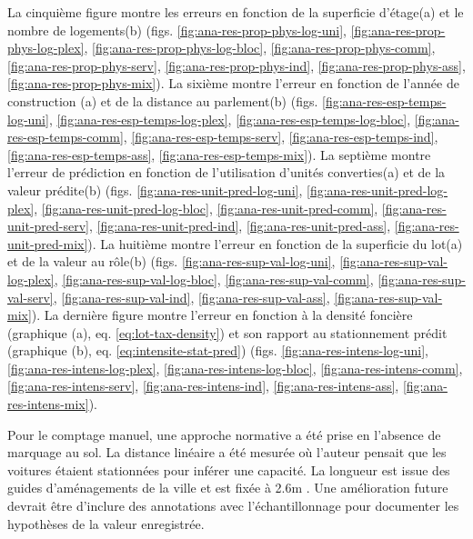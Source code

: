 La cinquième figure montre les erreurs en fonction de la superficie d'étage(a) et le nombre de logements(b) (figs. \ref{fig:ana-res-prop-phys-log-uni}, \ref{fig:ana-res-prop-phys-log-plex}, \ref{fig:ana-res-prop-phys-log-bloc}, \ref{fig:ana-res-prop-phys-comm}, \ref{fig:ana-res-prop-phys-serv}, \ref{fig:ana-res-prop-phys-ind}, \ref{fig:ana-res-prop-phys-ass}, \ref{fig:ana-res-prop-phys-mix}). La sixième montre l'erreur en fonction de l'année de construction (a) et de la distance au parlement(b) (figs. \ref{fig:ana-res-esp-temps-log-uni}, \ref{fig:ana-res-esp-temps-log-plex}, \ref{fig:ana-res-esp-temps-log-bloc}, \ref{fig:ana-res-esp-temps-comm}, \ref{fig:ana-res-esp-temps-serv}, \ref{fig:ana-res-esp-temps-ind}, \ref{fig:ana-res-esp-temps-ass}, \ref{fig:ana-res-esp-temps-mix}). La septième montre l'erreur de prédiction en fonction de l'utilisation d'unités converties(a) et de la valeur prédite(b) (figs. \ref{fig:ana-res-unit-pred-log-uni}, \ref{fig:ana-res-unit-pred-log-plex}, \ref{fig:ana-res-unit-pred-log-bloc}, \ref{fig:ana-res-unit-pred-comm}, \ref{fig:ana-res-unit-pred-serv}, \ref{fig:ana-res-unit-pred-ind}, \ref{fig:ana-res-unit-pred-ass}, \ref{fig:ana-res-unit-pred-mix}). La huitième montre l'erreur en fonction de la superficie du lot(a) et de la valeur au rôle(b) (figs. \ref{fig:ana-res-sup-val-log-uni}, \ref{fig:ana-res-sup-val-log-plex}, \ref{fig:ana-res-sup-val-log-bloc}, \ref{fig:ana-res-sup-val-comm}, \ref{fig:ana-res-sup-val-serv}, \ref{fig:ana-res-sup-val-ind}, \ref{fig:ana-res-sup-val-ass}, \ref{fig:ana-res-sup-val-mix}). La dernière figure montre l'erreur en fonction à la densité foncière (graphique (a), eq. \ref{eq:lot-tax-density}) et son rapport au stationnement prédit (graphique (b), eq. \ref{eq:intensite-stat-pred}) (figs. \ref{fig:ana-res-intens-log-uni}, \ref{fig:ana-res-intens-log-plex}, \ref{fig:ana-res-intens-log-bloc}, \ref{fig:ana-res-intens-comm}, \ref{fig:ana-res-intens-serv}, \ref{fig:ana-res-intens-ind}, \ref{fig:ana-res-intens-ass}, \ref{fig:ana-res-intens-mix}).\par
Pour le comptage manuel, une approche normative a été prise en l'absence de marquage au sol. La distance linéaire a été mesurée où l'auteur pensait que les voitures étaient stationnées pour inférer une capacité. La longueur est issue des guides d'aménagements de la ville et est fixée à 2.6m \parencite{ville_de_quebec_normes_2024,ville_de_quebec_budget_2025}. Une amélioration future devrait être d'inclure des annotations avec l'échantillonnage pour documenter les hypothèses de la valeur enregistrée.\par
